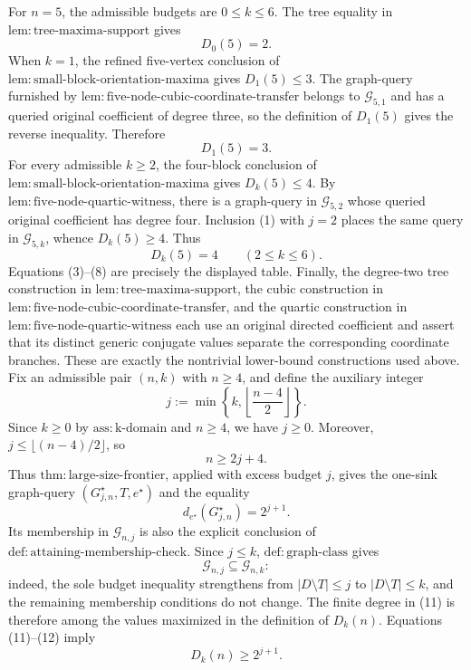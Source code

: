 For \(n=5\), the admissible budgets are \(0\leq k\leq6\).  The tree equality in \(\mathrm{lem:tree\mbox{-}maxima\mbox{-}support}\) gives
\[
 D_0(5)=2.
\tag{6}
\]
When \(k=1\), the refined five-vertex conclusion of \(\mathrm{lem:small\mbox{-}block\mbox{-}orientation\mbox{-}maxima}\) gives \(D_1(5)\leq3\).  The graph-query furnished by \(\mathrm{lem:five\mbox{-}node\mbox{-}cubic\mbox{-}coordinate\mbox{-}transfer}\) belongs to \(\mathcal G_{5,1}\) and has a queried original coefficient of degree three, so the definition of \(D_1(5)\) gives the reverse inequality.  Therefore
\[
 D_1(5)=3.
\tag{7}
\]
For every admissible \(k\geq2\), the four-block conclusion of \(\mathrm{lem:small\mbox{-}block\mbox{-}orientation\mbox{-}maxima}\) gives \(D_k(5)\leq4\).  By \(\mathrm{lem:five\mbox{-}node\mbox{-}quartic\mbox{-}witness}\), there is a graph-query in \(\mathcal G_{5,2}\) whose queried original coefficient has degree four.  Inclusion (1) with \(j=2\) places the same query in \(\mathcal G_{5,k}\), whence \(D_k(5)\geq4\).  Thus
\[
 D_k(5)=4\qquad(2\leq k\leq6).
\tag{8}
\]
Equations (3)--(8) are precisely the displayed table.  Finally, the degree-two tree construction in \(\mathrm{lem:tree\mbox{-}maxima\mbox{-}support}\), the cubic construction in \(\mathrm{lem:five\mbox{-}node\mbox{-}cubic\mbox{-}coordinate\mbox{-}transfer}\), and the quartic construction in \(\mathrm{lem:five\mbox{-}node\mbox{-}quartic\mbox{-}witness}\) each use an original directed coefficient and assert that its distinct generic conjugate values separate the corresponding coordinate branches.  These are exactly the nontrivial lower-bound constructions used above.
Fix an admissible pair \((n,k)\) with \(n\geq4\), and define the auxiliary integer
\[
 j:=\min\!\left\{k,\left\lfloor\frac{n-4}{2}\right\rfloor\right\}.
\tag{9}
\]
Since \(k\geq0\) by \(\mathrm{ass:k\mbox{-}domain}\) and \(n\geq4\), we have \(j\geq0\).  Moreover, \(j\leq\lfloor(n-4)/2\rfloor\), so
\[
 n\geq2j+4.
\tag{10}
\]
Thus \(\mathrm{thm:large\mbox{-}size\mbox{-}frontier}\), applied with excess budget \(j\), gives the one-sink graph-query \((G^{\star}_{j,n},T,e^{\star})\) and the equality
\[
 d_{e^{\star}}(G^{\star}_{j,n})=2^{j+1}.
\tag{11}
\]
Its membership in \(\mathcal G_{n,j}\) is also the explicit conclusion of \(\mathrm{def:attaining\mbox{-}membership\mbox{-}check}\).  Since \(j\leq k\), \(\mathrm{def:graph\mbox{-}class}\) gives
\[
 \mathcal G_{n,j}\subseteq\mathcal G_{n,k}:
\tag{12}
\]
indeed, the sole budget inequality strengthens from \(|D\setminus T|\leq j\) to \(|D\setminus T|\leq k\), and the remaining membership conditions do not change.  The finite degree in (11) is therefore among the values maximized in the definition of \(D_k(n)\).  Equations (11)--(12) imply
\[
 D_k(n)\geq2^{j+1}.
\tag{13}
\]

